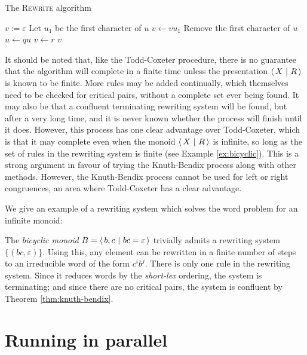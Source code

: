 \begin{algorithm}
\caption{The \textsc{Rewrite} algorithm}
\label{alg:rewrite}
\begin{algorithmic}[1]
\State $v := \varepsilon$
  \State Let $u_1$ be the first character of $u$
  \State $v \gets v u_1$
  \State Remove the first character of $u$
      \State $u \gets qu$
      \State $v \gets r$
      \State \Break
    \EndIf
  \EndFor
\EndWhile
\State \Return $v$
\EndProcedure
\end{algorithmic}
\end{algorithm}

It should be noted that, like the
Todd-Coxeter procedure, there is no guarantee that the algorithm will complete
in a finite time unless the presentation $\left\langle\,X ~\middle|~ R\,\right\rangle$ is known to be finite.
More rules may be added continually, which themselves need to
be checked for critical pairs, without a complete set ever being found.  It may
also be that a confluent terminating rewriting system will be found, but after a
very long time, and it is never known whether the process will finish until it
does.  However, this process has one clear advantage over Todd-Coxeter, which is
that it may complete even when the monoid $\left\langle\,X ~\middle|~ R\,\right\rangle$ is infinite, so long as
the set of rules in the rewriting system is finite
(see Example \ref{ex:bicyclic}).  This is a strong argument
in favour of trying the Knuth-Bendix process along with other methods.  However,
the Knuth-Bendix process cannot be used for left or right congruences, an area
where Todd-Coxeter has a clear advantage.

We give an example of a rewriting system which solves the word problem for an
infinite monoid:

\begin{example}
  \label{ex:bicyclic}
  The \textit{bicyclic monoid} $B = \left\langle\,b,c ~\middle|~ bc=\varepsilon\,\right\rangle$ trivially admits
  a rewriting system $\{(bc, \varepsilon)\}$.  Using this, any element can be
  rewritten in a finite number of steps to an irreducible word of the form
  $c^ib^j$.  There is only one rule in the rewriting system.  Since it reduces
  words by the \textit{short-lex} ordering, the system is terminating; and since
  there are no critical pairs, the system is confluent by Theorem
  \ref{thm:knuth-bendix}.
\end{example}

\section{Running in parallel}
\label{sec:running-in-parallel}

